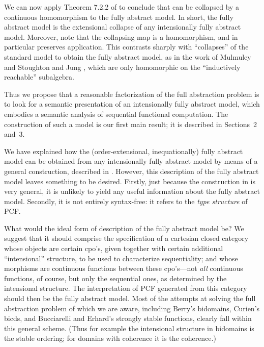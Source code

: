 \documentclass[11pt]{article}
\begin{document}
We can now apply Theorem 7.2.2 of \cite{StoughtonA:fulamp} to conclude
that  
can be collapsed by a continuous homomorphism to the fully abstract model.
In short, the fully abstract model is the extensional collapse of
any intensionally fully abstract model. Moreover, note that the collapsing
map is  a homomorphism, and in particular preserves application. This
contrasts sharply with ``collapses'' of the standard model to obtain the
fully abstract model, as in the work of Mulmuley \cite{MulmuleyK:fulase} and
Stoughton and Jung \cite{JungA:stufam}, which are only homomorphic on the
``inductively reachable'' subalgebra.

Thus we propose that a reasonable factorization of the full abstraction
problem is to look for  a semantic presentation of an intensionally
fully abstract model, which embodies a semantic analysis of sequential
functional computation. 
The construction of such a model is our first main result; it is described
in Sections~2 and~3.

We have explained how the (order-extensional, inequationally) fully abstract
model can be obtained from any intensionally fully abstract model
by means of a general construction, described in \cite{StoughtonA:fulamp}. 
However, this description of the fully
abstract model leaves something to be desired. Firstly, just because the
construction in \cite{StoughtonA:fulamp} is very general, it is
unlikely to yield any useful information
about the fully abstract model. Secondly, it is not entirely syntax-free:
it refers to the {\sl type structure} of PCF.

What would the ideal form of description of the fully abstract model be?
We suggest that it should comprise the specification of a cartesian closed
category whose objects are certain cpo's, given together with certain
additional ``intensional'' structure, to be used to characterize sequentiality;
and whose morphisms are continuous functions between these cpo's---not
{\sl all} continuous functions, of course, but only the sequential ones,
as determined by the intensional structure. The interpretation of PCF
generated from this category should then be the fully abstract model.
Most of the attempts at solving the full abstraction problem of which we
are aware, including Berry's bidomains, Curien's bicds, and Bucciarelli
and Erhard's strongly stable functions, clearly fall within this general
scheme. (Thus for example the intensional structure in bidomains is the
stable ordering; for domains with coherence it is the coherence.)
\end{document}
